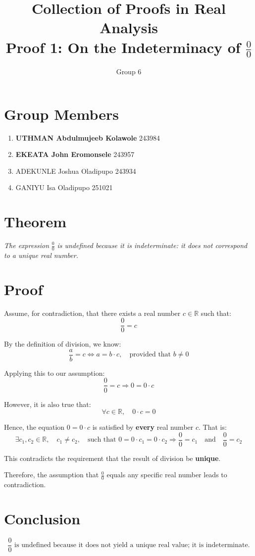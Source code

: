 \documentclass[12pt]{article}
\title{Collection of Proofs in Real Analysis \\ \large Proof 1: On the Indeterminacy of \texorpdfstring{$\frac{0}{0}$}{0/0}}
\author{Group 6}
\date{\vspace{-1cm}}
\begin{document}
\section*{Group Members}
\begin{enumerate}[label=\arabic*.]
    \item \textbf{UTHMAN Abdulmujeeb Kolawole} \hfill 243984
    \item \textbf{EKEATA John Eromonsele} \hfill 243957
    \item ADEKUNLE Joshua Oladipupo \hfill 243934
    \item GANIYU Isa Oladipupo \hfill 251021
\end{enumerate}

\section*{Theorem}
\textit{The expression} \( \frac{0}{0} \) \textit{is undefined because it is indeterminate: it does not correspond to a unique real number.}

\section*{Proof}

Assume, for contradiction, that there exists a real number \( c \in \mathbb{R} \) such that:
\[
\frac{0}{0} = c
\]

By the definition of division, we know:
\begin{equation*}
\frac{a}{b} = c \iff a = b \cdot c, \quad \text{provided that } b \neq 0
\end{equation*}

Applying this to our assumption:
\begin{equation*}
\frac{0}{0} = c \Rightarrow 0 = 0 \cdot c
\end{equation*}

However, it is also true that:
\begin{equation*}
\forall c \in \mathbb{R},\quad 0 \cdot c = 0
\end{equation*}

Hence, the equation \( 0 = 0 \cdot c \) is satisfied by \textbf{every} real number \( c \). That is:
\begin{equation*}
\exists c_1, c_2 \in \mathbb{R},\quad c_1 \ne c_2,\quad \text{such that } 0 = 0 \cdot c_1 = 0 \cdot c_2
\Rightarrow \frac{0}{0} = c_1 \quad \text{and} \quad \frac{0}{0} = c_2
\end{equation*}

This contradicts the requirement that the result of division be \textbf{unique}.

\medskip

\noindent Therefore, the assumption that \( \frac{0}{0} \) equals any specific real number leads to contradiction.

\section*{Conclusion}

\begin{equation*}
\boxed{
\frac{0}{0} \text{ is undefined because it does not yield a unique real value; it is indeterminate.}
}
\end{equation*}
\end{document}
